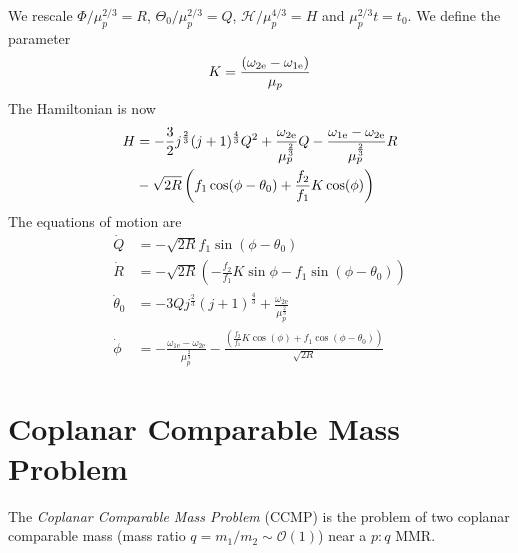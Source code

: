 \documentclass[usenatbib,twocolumn]{mnras}
\begin{document}
We rescale $\Phi/\mu_p^{2/3}=R$, $\Theta_0/\mu_p^{2/3}=Q$, $\mathcal H/\mu_p^{4/3}=H$ and $\mu_p^{2/3}t=t_0$.
We define the parameter
\begin{equation}
    K=\frac{(\omega_{\rm 2e}-\omega_{\rm 1e})}{\mu_p}
\end{equation}
The Hamiltonian is now
\begin{align}\label{eq:order1H}
    H &= -\frac32 j^\frac23(j+1)^\frac43Q^2+\frac{\omega_{2\rm e}}{\mu_p^\frac23} Q - \frac{\omega_{\rm 1e}-\omega_{\rm 2e}}{\mu_p^\frac23}R\nonumber\\
    & -\sqrt{2R}\left(f_1\cos(\phi-\theta_0)+\frac{f_2}{f_1}K\cos(\phi)\right)
\end{align}
The equations of motion are 
\begin{align}
\dot Q&=- \sqrt{2R} f_{1} \sin{\left(\phi - \theta_{0} \right)}\\
\dot R&=- \sqrt{2R} \left(-\frac{f_2}{f_1}K\sin\phi - f_{1} \sin{\left(\phi - \theta_{0} \right)}\right)\\
\dot\theta_0&=- 3 Q j^{\frac{2}{3}} \left(j + 1\right)^{\frac{4}{3}} + \frac{\omega_{\mathrm{2e}}}{\mu_{p}^{\frac{2}{3}}}\\
\dot\phi&=- \frac{\omega_{\mathrm{1e}} - \omega_{\mathrm{2e}}}{\mu_{p}^{\frac{2}{3}}} - \frac{\left( \frac{f_2}{f_1}K\cos(\phi)+ f_{1} \cos{\left(\phi - \theta_{0} \right)}\right)}{ \sqrt{2R}}
\end{align}


\clearpage
\section{Coplanar Comparable Mass Problem}
The \emph{Coplanar Comparable Mass Problem} (CCMP) is the problem of two coplanar comparable mass (mass ratio $q=m_1/m_2\sim\mathcal O(1)$) near a $p:q$ MMR.
\end{document}

